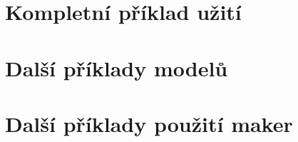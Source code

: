 \documentclass[thesis=M,czech]{FITthesis}[2012/06/26]
\newcommand{\acrlabel}[1]{acr:#1}
\newcommand{\acr}[1]{\acrshort{\acrlabel{#1}}}
\begin{document}

\appendix






\printglossary[type=\acronymtype, title=Seznam použitých symbolů a zkratek]


\chapter{Kompletní příklad užití}


\chapter{Další příklady modelů}


\chapter{Další příklady použití maker}






\end{document}
